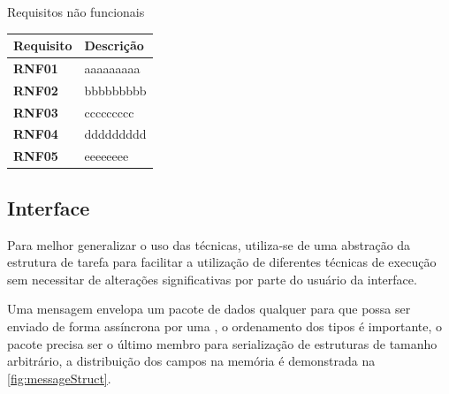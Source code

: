 \begin{quadro}[H]
    \centering
    \caption{Requisitos não funcionais}
    \begin{tabular}{|p{}|p{}|}
        \hline
        \rowcolor[HTML]{C0C0C0}
        \textbf{Requisito} & \textbf{Descrição}  \\
        \hline
        
        \textbf{RNF01} & aaaaaaaaa \\ 
        \hline

        \textbf{RNF02} & bbbbbbbbb \\
        \hline
        
        \textbf{RNF03} & ccccccccc \\
        \hline
        
        \textbf{RNF04} & ddddddddd \\
        \hline
        
        \textbf{RNF05} & eeeeeeee \\
        \hline
    \end{tabular}
    \label{tab:rf}
\end{quadro}

\subsection{Interface}

Para melhor generalizar o uso das técnicas, utiliza-se de uma abstração da estrutura de tarefa para facilitar a utilização de diferentes técnicas de execução sem necessitar de alterações significativas por parte do usuário da interface.


Uma mensagem envelopa um pacote de dados qualquer para que possa ser enviado de forma assíncrona por uma , o ordenamento dos tipos é importante, o pacote precisa ser o último membro para serialização de estruturas de tamanho arbitrário, a distribuição dos campos na memória é demonstrada na \autoref{fig:messageStruct}. 


